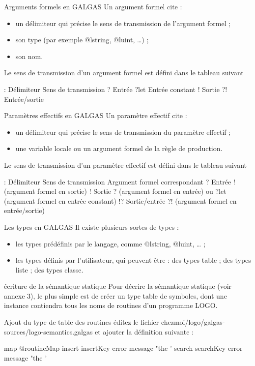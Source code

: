 Arguments formels en GALGAS
Un argument formel cite :
\begin{itemize}
  \item un délimiteur qui précise le sens de transmission de l'argument formel ;
  \item son type (par exemple @lstring, @luint, …) ;
  \item son nom.
\end{itemize}


Le sens de transmission d'un argument formel est défini dans le tableau suivant 

:
Délimiteur	Sens de transmission
?	Entrée
?let	Entrée constant
!	Sortie
?!	Entrée/sortie

Paramètres effectifs en GALGAS
Un paramètre effectif cite :
\begin{itemize}
  \item un délimiteur qui précise le sens de transmission du paramètre effectif ;
  \item une variable locale ou un argument formel de la règle de production.
\end{itemize}

Le sens de transmission d'un paramètre effectif est défini dans le tableau suivant 

:
Délimiteur	Sens de transmission	Argument formel correspondant
?	Entrée	! (argument formel en sortie)
!	Sortie	? (argument formel en entrée) ou
?let (argument formel en entrée constant)
!?	Sortie/entrée	?! (argument formel en entrée/sortie)

Les types en GALGAS
Il existe plusieurs sortes de types :
\begin{itemize}
  \item les types prédéfinis par le langage, comme @lstring, @luint, … ;
  \item les types définis par l'utilisateur, qui peuvent être :
	des types table ;
	des types liste ;
	des types classe.
\end{itemize}

écriture de la sémantique statique
Pour décrire la sémantique statique (voir annexe 3), le plus simple est de créer un type table de symboles, dont une instance contiendra tous les noms de routines d'un programme LOGO.

Ajout du type de table des routines
éditez le fichier chezmoi/logo/galgas-sources/logo-semantics.galgas et ajouter la définition suivante :

\begin{galgascode}
map @routineMap {
  insert insertKey error message "the '%
  search searchKey error message "the '%
}
\end{galgascode}

